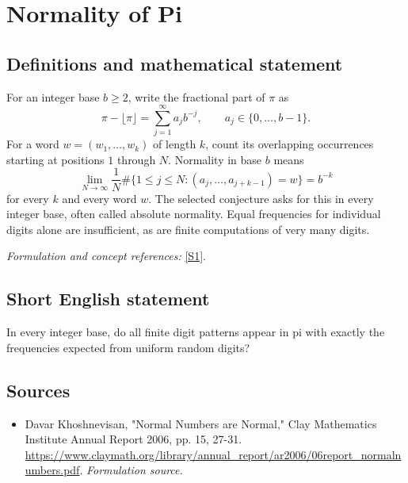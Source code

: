 \documentclass[11pt]{article}
\begin{document}
\section*{\texorpdfstring{Normality of Pi}{Normality of Pi}}\label{471}
\subsection{Definitions and mathematical statement}
For an integer base $b\ge2$, write the fractional part of $\pi$ as
\[
 \pi-\lfloor\pi\rfloor=\sum_{j=1}^{\infty}a_jb^{-j},
 \qquad a_j\in\{0,\ldots,b-1\}.
\]
For a word $w=(w_1,\ldots,w_k)$ of length $k$, count its overlapping occurrences starting at positions $1$ through $N$. Normality in base $b$ means
\[
 \lim_{N\to\infty}\frac1N
 \#\{1\le j\le N:(a_j,\ldots,a_{j+k-1})=w\}=b^{-k}
\]
for every $k$ and every word $w$. The selected conjecture asks for this in every integer base, often called absolute normality. Equal frequencies for individual digits alone are insufficient, as are finite computations of very many digits.
\par\smallskip\textit{Formulation and concept references:} \href{https://www.claymath.org/library/annual_report/ar2006/06report_normalnumbers.pdf}{[S1]}.

\subsection{Short English statement}
In every integer base, do all finite digit patterns appear in pi with exactly the frequencies expected from uniform random digits?
\subsection{Sources}
\begin{itemize}
\item[S1]Davar Khoshnevisan, "Normal Numbers are Normal," Clay Mathematics Institute Annual Report 2006, pp. 15, 27-31.
\url{https://www.claymath.org/library/annual_report/ar2006/06report_normalnumbers.pdf}.
\textit{Formulation source.}
\end{itemize}
\end{document}
